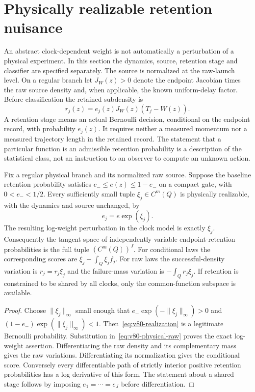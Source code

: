 \section{Physically realizable retention nuisance}
\label{sec:v80-physical-nuisance}

An abstract clock-dependent weight is not automatically a perturbation
of a physical experiment.  In this section the dynamics, source,
retention stage and classifier are specified separately.  The source is
normalized at the raw-launch level.  On a regular branch let $J_W(z)>0$
denote the endpoint Jacobian times the raw source density and, when
applicable, the known uniform-delay factor.  Before classification the
retained subdensity is
\begin{equation}\label{eq:v80-physical-raw}
                    r_j(z)=e_j(z)J_W(z)(T_j-W(z)).
\end{equation}
A retention stage means an actual Bernoulli decision, conditional on
the endpoint record, with probability $e_j(z)$.  It requires neither a
measured momentum nor a measured trajectory length in the retained
record.  The statement that a particular function is an admissible
retention probability is a description of the statistical class, not
an instruction to an observer to compute an unknown action.

\begin{proposition}
\label{prop:v80-retention-tangent}
Fix a regular physical branch and its normalized raw source.  Suppose
the baseline retention probability satisfies
$e_-\le e(z)\le1-e_-$ on a compact gate, with $0<e_-<1/2$.
Every sufficiently small tuple $\xi_j\in C^m(Q)$ is physically
realizable, with the dynamics and source unchanged, by
\begin{equation}\label{eq:v80-realization}
                       e_j=e\exp(\xi_j).
\end{equation}
The resulting log-weight perturbation in the clock model is exactly
$\xi_j$.  Consequently the tangent space of independently variable
endpoint-retention probabilities is the full tuple $(C^m(Q))^J$.
For conditional laws the corresponding scores are
$\xi_j-\int_Q\xi_j f_j$.  For raw laws the successful-density
variation is $\dot r_j=r_j\xi_j$ and the failure-mass variation is
$-\int_Qr_j\xi_j$.  If retention is constrained to be shared by all
clocks, only the common-function subspace is available.
\end{proposition}
\begin{proof}
Choose $\|\xi_j\|_\infty$ small enough that
$e_-\exp(-\|\xi_j\|_\infty)>0$ and
$(1-e_-)\exp(\|\xi_j\|_\infty)<1$.
Then~\eqref{eq:v80-realization} is a legitimate Bernoulli probability.
Substitution in~\eqref{eq:v80-physical-raw} proves the exact log-weight
assertion.  Differentiating the raw density and its complementary mass
gives the raw variations.  Differentiating its normalization gives the
conditional score.  Conversely every differentiable path of strictly
interior positive retention probabilities has a log derivative of this
form.  The statement about a shared stage follows by imposing
$e_1=\cdots=e_J$ before differentiation.
\end{proof}


